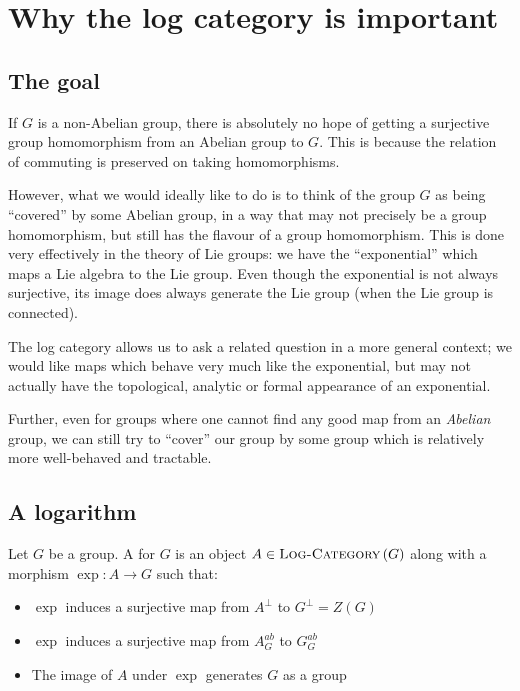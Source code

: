 \documentclass[a4paper]{amsart}
\newcommand{\logcategory}[1]{\textsc{Log-Category}\left(#1\right)}
\begin{document}
\section{Why the log category is important}

\subsection{The goal}

If $G$ is a non-Abelian group, there is absolutely no hope of getting
a surjective group homomorphism from an Abelian group to $G$. This is because
the relation of commuting is preserved on taking homomorphisms.

However, what we would ideally like to do is to think of the group $G$
as being ``covered'' by some Abelian group, in a way that may not
precisely be a group homomorphism, but still has the flavour of a
group homomorphism. This is done very effectively in the theory of Lie
groups: we have the ``exponential'' which maps a Lie algebra to the
Lie group. Even though the exponential is not always surjective, its
image does always generate the Lie group (when the Lie group is
connected).

The log category allows us to ask a related question in a more general
context; we would like maps which behave very much like the
exponential, but may not actually have the topological, analytic or
formal appearance of an exponential.

Further, even for groups where one cannot find any good map from an
{\em Abelian} group, we can still try to ``cover'' our group by some
group which is relatively more well-behaved and tractable.

\subsection{A logarithm}

\begin{definer}
  Let $G$ be a group. A  for $G$ is an object $A
  \in \logcategory{G}$ along with a morphism $\exp :A \to G$ such that:

  \begin{itemize}

  \item $\exp$ induces a surjective map from $A^\perp$ to $G^\perp = Z(G)$

  \item $\exp$ induces a surjective map from $A^{ab}_G$ to $G^{ab}_G$

  \item The image of $A$ under $\exp$ generates $G$ as a group

  \end{itemize}

\end{definer}
\end{document}
